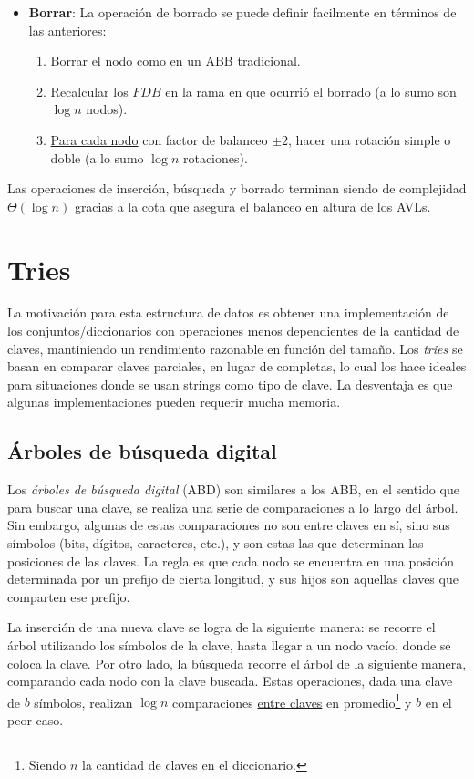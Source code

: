 \documentclass{article}
\newcommand{\BigTheta}[1]{{\Theta(#1)}}
\begin{document}
\begin{itemize}
    \item \textbf{Borrar}: La operación de borrado se puede definir facilmente en términos de las anteriores:
          \begin{enumerate}
              \item Borrar el nodo como en un ABB tradicional.
              \item Recalcular los $FDB$ en la rama en que ocurrió el borrado (a lo sumo son $\log{n}$ nodos).
              \item \underline{Para cada nodo} con factor de balanceo $\pm 2$, hacer una rotación simple o doble (a lo sumo $\log{n}$ rotaciones).
          \end{enumerate}


\end{itemize}

Las operaciones de inserción, búsqueda y borrado terminan siendo de complejidad $\BigTheta{\log{n}}$ gracias a la cota que asegura el balanceo en altura de los AVLs.

\section{Tries}

La motivación para esta estructura de datos es obtener una implementación de los conjuntos/diccionarios con operaciones menos dependientes de la cantidad de claves, mantiniendo un rendimiento razonable en función del tamaño. Los \textit{tries} se basan en comparar claves parciales, en lugar de completas, lo cual los hace ideales para situaciones donde se usan strings como tipo de clave. La desventaja es que algunas implementaciones pueden requerir mucha memoria.

\subsection{Árboles de búsqueda digital}

Los \textit{árboles de búsqueda digital} (ABD) son similares a los ABB, en el sentido que para buscar una clave, se realiza una serie de comparaciones a lo largo del árbol. Sin embargo, algunas de estas comparaciones no son entre claves en sí, sino sus símbolos (bits, dígitos, caracteres, etc.), y son estas las que determinan las posiciones de las claves. La regla es que cada nodo se encuentra en una posición determinada por un prefijo de cierta longitud, y sus hijos son aquellas claves que comparten ese prefijo.

La inserción de una nueva clave se logra de la siguiente manera: se recorre el árbol utilizando los símbolos de la clave, hasta llegar a un nodo vacío, donde se coloca la clave. Por otro lado, la búsqueda recorre el árbol de la siguiente manera, comparando cada nodo con la clave buscada. Estas operaciones, dada una clave de $b$ símbolos, realizan $\log{n}$ comparaciones \underline{entre claves} en promedio\footnote{Siendo $n$ la cantidad de claves en el diccionario.} y $b$ en el peor caso.
\end{document}
